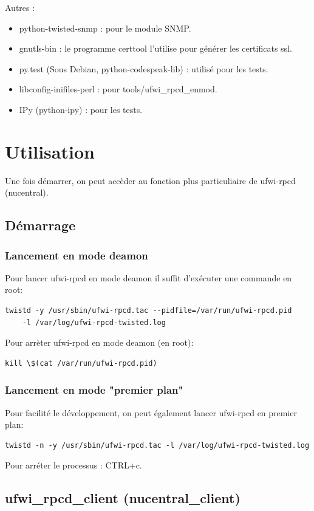 \documentclass[12pt]{report}
\begin{document}
\begin{itemize}
Autres :
\begin{itemize}
  \item python-twisted-snmp : pour le module SNMP.
  \item gnutls-bin : le programme certtool l'utilise pour générer les certificats ssl.
  \item py.test (Sous Debian, python-codespeak-lib) : utilisé pour les tests.
  \item libconfig-inifiles-perl : pour tools/ufwi\_rpcd\_enmod.
  \item IPy (python-ipy) : pour les tests.
\end{itemize}

\section{Utilisation}
Une fois démarrer, on peut accèder au fonction plus particuliaire de ufwi-rpcd (nucentral).
\subsection{Démarrage}
\subsubsection{Lancement en mode deamon}
Pour lancer ufwi-rpcd en mode deamon il suffit d'exécuter une commande en root:
\begin{verbatim}
twistd -y /usr/sbin/ufwi-rpcd.tac --pidfile=/var/run/ufwi-rpcd.pid 
    -l /var/log/ufwi-rpcd-twisted.log
\end{verbatim}
   
Pour arrèter ufwi-rpcd en mode deamon (en root):
\begin{verbatim}kill \$(cat /var/run/ufwi-rpcd.pid)\end{verbatim}
   
\subsubsection{Lancement en mode "premier plan"}
Pour facilité le développement, on peut également lancer ufwi-rpcd en premier plan:
\begin{verbatim}twistd -n -y /usr/sbin/ufwi-rpcd.tac -l /var/log/ufwi-rpcd-twisted.log\end{verbatim}
Pour arréter le processus : CTRL+c.

\subsection{ufwi\_rpcd\_client (nucentral\_client)}

\end{itemize}
\end{document}
